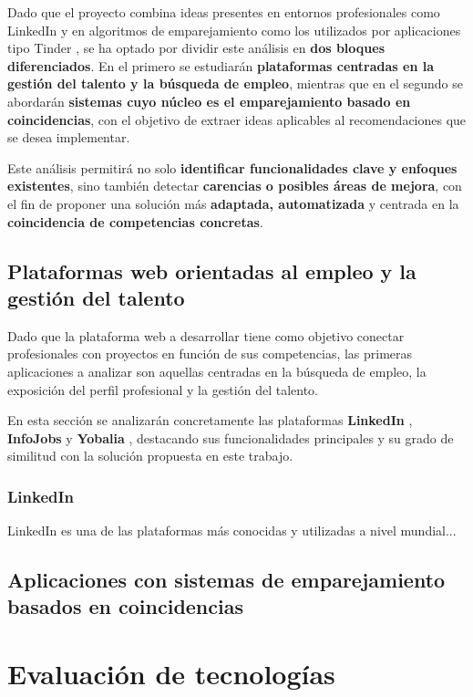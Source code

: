 Dado que el proyecto combina ideas presentes en entornos profesionales como LinkedIn \cite{linkedin}
y en algoritmos de emparejamiento como los utilizados por aplicaciones tipo Tinder \cite{tinder}, se 
ha optado por dividir este análisis en \textbf{dos bloques diferenciados}. En el primero se 
estudiarán \textbf{plataformas centradas en la gestión del talento y la búsqueda de empleo}, 
mientras que en el segundo se abordarán \textbf{sistemas cuyo núcleo es el emparejamiento 
basado en coincidencias}, con el objetivo de extraer ideas aplicables al 
\gls{recomendaciones} que se desea implementar.

Este análisis permitirá no solo \textbf{identificar funcionalidades clave y enfoques existentes}, 
sino también detectar \textbf{carencias o posibles áreas de mejora}, con el fin de proponer 
una solución más \textbf{adaptada, automatizada} y centrada en la 
\textbf{coincidencia de competencias concretas}.

\subsection{Plataformas web orientadas al empleo y la gestión del talento}

Dado que la plataforma web a desarrollar tiene como objetivo conectar profesionales con 
proyectos en función de sus competencias, las primeras aplicaciones a analizar son aquellas 
centradas en la búsqueda de empleo, la exposición del perfil profesional y la gestión del talento.

En esta sección se analizarán concretamente las plataformas \textbf{LinkedIn} \cite{linkedin}, 
\textbf{InfoJobs} \cite{infojobs} y \textbf{Yobalia} \cite{yobalia}, destacando sus funcionalidades principales y su grado 
de similitud con la solución propuesta en este trabajo.

\subsubsection{LinkedIn}
LinkedIn es una de las plataformas más conocidas y utilizadas a nivel mundial...


\subsection{Aplicaciones con sistemas de emparejamiento basados en coincidencias}


\section{Evaluación de tecnologías}\label{sec:evaluacion-tecnologias}
